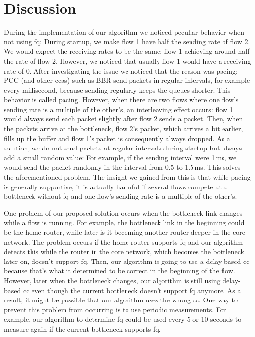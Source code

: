 \documentclass[runningheads]{llncs}
\begin{document}
\section{Discussion}

During the implementation of our algorithm we noticed peculiar behavior when not using \gls{fq}: During startup, we make flow 1 have half the sending rate of flow 2. We would expect the receiving rates to be the same: flow 1 achieving around half the rate of flow 2. However, we noticed that usually flow 1 would have a receiving rate of 0. After investigating the issue we noticed that the reason was pacing: PCC (and other \glspl{cca}) such as BBR send packets in regular intervals, for example every millisecond, because sending regularly keeps the queues shorter. This behavior is called pacing. However, when there are two flows where one flow's sending rate is a multiple of the other's, an interleaving effect occurs: flow 1 would always send each packet slightly after flow 2 sends a packet. Then, when the packets arrive at the bottleneck, flow 2's packet, which arrives a bit earlier, fills up the buffer and flow 1's packet is consequently always dropped. As a solution, we do not send packets at regular intervals during startup but always add a small random value: For example, if the sending interval were 1\,ms, we would send the packet randomly in the interval from 0.5 to 1.5\,ms. This solves the aforementioned problem. The insight we gained from this is that while pacing is generally supportive, it is actually harmful if several flows compete at a bottleneck without \gls{fq} and one flow's sending rate is a multiple of the other's.

One problem of our proposed solution occurs when the bottleneck link changes while a flow is running. For example, the bottleneck link in the beginning could be the home router, while later is it becoming another router deeper in the core network. The problem occurs if the home router supports \gls{fq} and our algorithm detects this while the router in the core network, which becomes the bottleneck later on, doesn't support \gls{fq}. Then, our algorithm is going to use a delay-based \gls{cc} because that's what it determined to be correct in the beginning of the flow. However, later when the bottleneck changes, our algorithm is still using delay-based \gls{cc} even though the current bottleneck doesn't support \gls{fq} anymore. As a result, it might be possible that our algorithm uses the wrong \gls{cc}. One way to prevent this problem from occurring is to use periodic measurements. For example, our algorithm to determine \gls{fq} could be used every 5 or 10 seconds to measure again if the current bottleneck supports \gls{fq}. 
\end{document}
